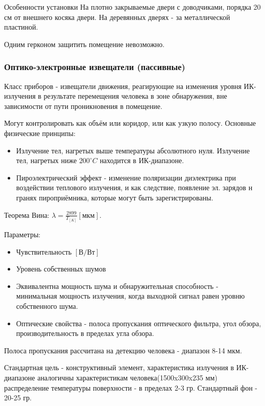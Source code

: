 \documentclass[a4paper,12pt]{report}
\begin{document}
	Особенности установки
		На плотно закрываемые двери с доводчиками, порядка 20 см от внешнего косяка двери.
		На деревянных дверях - за металлической пластиной.


	Одним герконом защитить помещение невозможно.



	\subsubsection{Оптико-электронные извещатели (пассивные)}

	Класс приборов - извещатели движения, реагирующие на изменения уровня ИК-излучения в результате перемещения человека в зоне обнаружения, вне зависимости от пути проникновения в помещение.

	Могут контролировать как объём или коридор, или как узкую полосу.
	Основные физические принципы:
	\begin{itemize}
	\item	Излучение тел, нагретых выше температуры абсолютного нуля. Излучение тел, нагретых ниже $200^{\circ} C $ находится в ИК-диапазоне.
	\item	Пироэлектрический эффект - изменение поляризации диэлектрика при воздействии теплового излучения, и как следствие, появление эл. зарядов н гранях пироприёмника, которые могут быть зарегистрированы.
	\end{itemize}
	Теорема Вина: $\lambda = \frac{2899}{T_{[K]}} [\mbox{мкм}]$.

	Параметры:
	\begin{itemize}
	\item	Чувствительность $[\mbox{В}/\mbox{Вт}]$
	\item	Уровень собственных шумов
	\item	Эквивалентна мощность шума и обнаружительная способность - минимальная мощность излучения, когда выходной сигнал равен уровню собственного шума.
	\item	Оптические свойства - полоса пропускания оптического фильтра, угол обзора, производительность в пределах угла обзора.
	\end{itemize}

	Полоса пропускания рассчитана на детекцию человека - диапазон 8-14 мкм.

	Стандартная цель - конструктивный элемент, характеристика излучения в ИК-диапазоне аналогичны характеристикам человека(1500x300x235 мм) распределение температуры поверхности - в пределах 2-3 гр. Стандартный фон - 20-25 гр.
\end{document}
